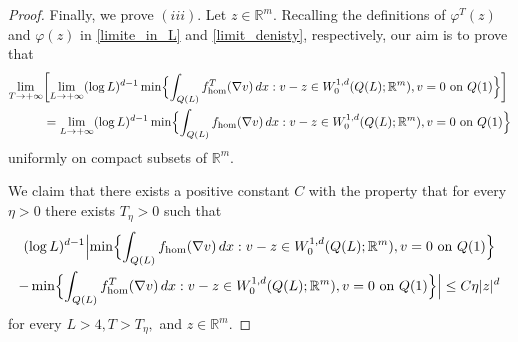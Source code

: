 \documentclass{article}
\theoremstyle{plain}
\theoremstyle{definition}
\def\rr{{\mathbb R}}
\newcommand{\f}{\varphi}
\numberwithin{equation}{section}
\begin{document}
\begin{proof}
    Finally, we prove $(iii)$.  Let $z\in\rr^m$. Recalling the definitions of $\f^T(z)$ and $\f(z)$ in \eqref{limite_in_L} and \eqref{limit_denisty}, respectively, our aim is to prove that
    \begin{equation*}
    \begin{split}
        \lim_{T\to +\infty}&\biggl[\lim_{L\to +\infty}(\log L)^{d-1}\min\Bigl\{ \int_{Q(L)}f^T_{\rm hom}(\nabla v)\, dx : v-z\in W^{1,d}_0(Q(L);\mathbb{R}^m), v= 0 \text{ on } Q( 1)\Bigr\}\biggr]\\
        &=\lim_{L\to +\infty}(\log L)^{d-1}\min\Bigl\{ \int_{Q(L)}f_{\rm hom}(\nabla v)\, dx : v-z\in W^{1,d}_0(Q(L);\mathbb{R}^m), v= 0 \text{ on } Q(1)\Bigr\}
    \end{split}
    \end{equation*}
      uniformly on compact subsets of $\rr^m$.
      
    We claim that there exists a positive constant $C$ with the property that for every $\eta>0$ there exists $T_\eta>0$ such that
    \begin{multline}
    \label{claim_1}
       (\log L)^{d-1}\Bigl|\min\Bigl\{ \int_{Q(L)}f_{\rm hom}(\nabla v)\, dx : v-z\in W^{1,d}_0(Q(L);\mathbb{R}^m), v=0 \text{ on } Q(1)\Bigr\} \\
       -  \min\Bigl\{ \int_{Q(L)}f^T_{\rm hom}(\nabla v)\, dx : v-z\in W^{1,d}_0(Q(L);\mathbb{R}^m), v=0 \text{ on } Q(1)\Bigr\}\Bigr|\leq C\eta|z|^d
    \end{multline}
for every $L>4, T>T_\eta,$ and $z\in\rr^m$.


\end{proof}
\end{document}
